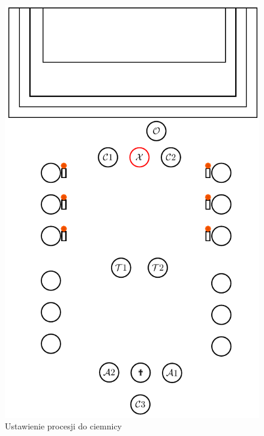 \begin{figure}[h]
      \centering
      \begin{minipage}{0.33\linewidth}
            \centering
            \includegraphics[width=\linewidth]{Figures/Czwartek/Procesja2.pdf}
            \caption{Ustawienie procesji do ciemnicy}
            \label{fig:procesja1}
      \end{minipage}
      \hfill
      \begin{minipage}{0.6\linewidth}
            \centering

\end{minipage}
\end{figure}
